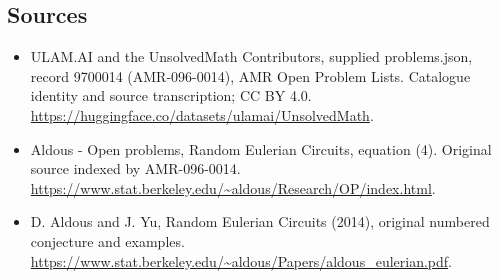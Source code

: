 \documentclass[11pt,a4paper]{article}
\begin{document}
\subsection{Sources}
\begin{itemize}
\item[S1] ULAM.AI and the UnsolvedMath Contributors, supplied problems.json, record 9700014 (AMR-096-0014), AMR Open Problem Lists. Catalogue identity and source transcription; CC BY 4.0.
\url{https://huggingface.co/datasets/ulamai/UnsolvedMath}.
\item[S2] Aldous - Open problems, Random Eulerian Circuits, equation (4). Original source indexed by AMR-096-0014.
\url{https://www.stat.berkeley.edu/~aldous/Research/OP/index.html}.
\item[S3] D. Aldous and J. Yu, Random Eulerian Circuits (2014), original numbered conjecture and examples.
\url{https://www.stat.berkeley.edu/~aldous/Papers/aldous_eulerian.pdf}.
\end{itemize}
\end{document}
